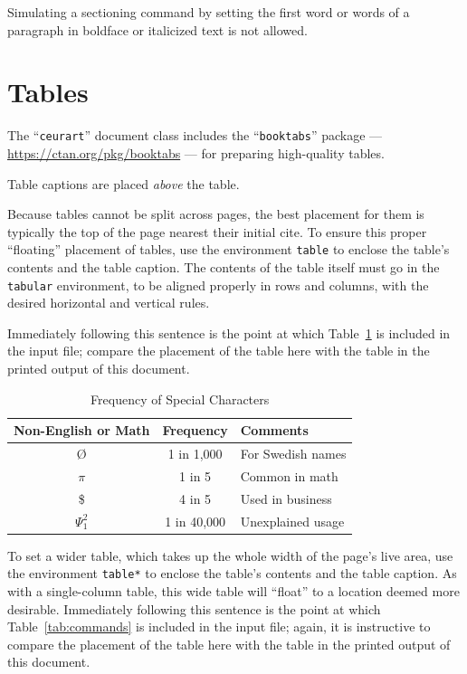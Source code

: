 \documentclass[
]{ceurart}
\begin{document}
Simulating a sectioning command by setting the first word or words of
a paragraph in boldface or italicized text is not allowed.

\section{Tables}

The ``\verb|ceurart|'' document class includes the ``\verb|booktabs|''
package --- \url{https://ctan.org/pkg/booktabs} --- for preparing
high-quality tables.

Table captions are placed \textit{above} the table.

Because tables cannot be split across pages, the best placement for
them is typically the top of the page nearest their initial cite.  To
ensure this proper ``floating'' placement of tables, use the
environment \verb|table| to enclose the table's contents and the
table caption. The contents of the table itself must go in the
\verb|tabular| environment, to be aligned properly in rows and
columns, with the desired horizontal and vertical rules.

Immediately following this sentence is the point at which
Table~\ref{tab:freq} is included in the input file; compare the
placement of the table here with the table in the printed output of
this document.

\begin{table}
  \caption{Frequency of Special Characters}
  \label{tab:freq}
  \begin{tabular}{ccl}
    \toprule
    Non-English or Math & Frequency   & Comments          \\
    \midrule
    \O                  & 1 in 1,000  & For Swedish names \\
    $\pi$               & 1 in 5      & Common in math    \\
    \$                  & 4 in 5      & Used in business  \\
    $\Psi^2_1$          & 1 in 40,000 & Unexplained usage \\
    \bottomrule
  \end{tabular}
\end{table}

To set a wider table, which takes up the whole width of the page's
live area, use the environment \verb|table*| to enclose the table's
contents and the table caption.  As with a single-column table, this
wide table will ``float'' to a location deemed more
desirable. Immediately following this sentence is the point at which
Table~\ref{tab:commands} is included in the input file; again, it is
instructive to compare the placement of the table here with the table
in the printed output of this document.
\end{document}
